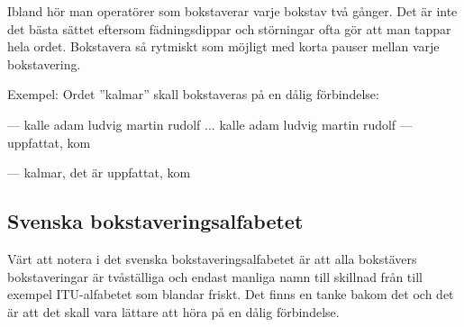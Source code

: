 Ibland hör man operatörer som bokstaverar varje bokstav två gånger. Det är inte det bästa sättet eftersom fädningsdippar och störningar ofta gör att man tappar hela ordet. Bokstavera så rytmiskt som möjligt med korta pauser mellan varje bokstavering.

Exempel: Ordet ''kalmar'' skall bokstaveras på en dålig förbindelse:

--- kalle adam ludvig martin rudolf ... kalle adam ludvig martin rudolf --- uppfattat, kom

--- kalmar, det är uppfattat, kom

\subsection{Svenska bokstaveringsalfabetet}

Värt att notera i det svenska bokstaveringsalfabetet är att alla bokstävers bokstaveringar är tvåställiga och endast manliga namn till skillnad från till exempel ITU-alfabetet som blandar friskt. Det finns en tanke bakom det och det är att det skall vara lättare att höra på en dålig förbindelse.

